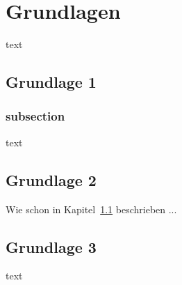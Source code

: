\chapter{Grundlagen}\label{chp:Grundlageb}
text

\section{Grundlage 1}\label{sec:Grundlage1}
\subsection{subsection}
text
\section{Grundlage 2}
Wie schon in Kapitel~\ref{sec:Grundlage1} beschrieben ...
\section{Grundlage 3}
text